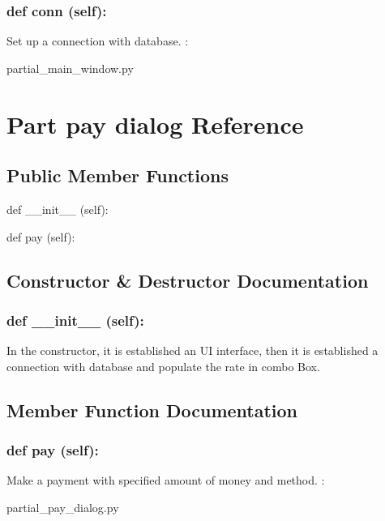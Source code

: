 \hypertarget{class_poly_a14a7ad77ce612b0c54f531d307ee4b39}{
\subsubsection[{def conn (self):}]{\setlength{\rightskip}{0pt plus 5cm}def {conn} (self):}}\label{class_poly_a14a7ad77ce612b0c54f531d307ee4b39}
Set up a connection with database.
:\begin{DoxyCompactItemize}
\item 
partial\_main\_window.\-py\end{DoxyCompactItemize}


\hypertarget{Part_pay_dialog}{\section{Part pay dialog Reference}
\label{Part_pay_dialog}
}
\subsection*{Public Member Functions}
\begin{DoxyCompactItemize}
\item 
def {\_\_init\_\_} (self):
\item 
def {pay} (self):

\end{DoxyCompactItemize}

\subsection{Constructor \& Destructor Documentation}
\hypertarget{class_poly_aa3def076b74bed67904976ad4f9fe9b1}{
\subsubsection[{def __init__ (self):}]{\setlength{\rightskip}{0pt plus 5cm}def {\_\_init\_\_} (self): 
}}
In the constructor, it is established an UI interface, then it is  established a connection with database and populate the rate in combo Box.
 

\subsection{Member Function Documentation}
\hypertarget{class_poly_a14a7ad77ce612b0c54f531d307ee4b39}{
\subsubsection[{def pay (self):}]{\setlength{\rightskip}{0pt plus 5cm}def {pay} (self):}}\label{class_poly_a14a7ad77ce612b0c54f531d307ee4b39}
Make a payment with specified amount of money and method.  
:\begin{DoxyCompactItemize}
\item 
partial\_pay\_dialog.\-py\end{DoxyCompactItemize}



